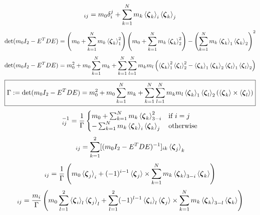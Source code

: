 \documentclass[10pt]{report}
\begin{document}
\begin{equation}[m_0I_2-E^TDE]_{ij}=m_0\delta_i^j+\sum_{k=1}^Nm_k\braket{\boldsymbol{\zeta}_k}_i\braket{\boldsymbol{\zeta}_k}_j\end{equation}
\begin{equation}\det(m_0I_2-E^TDE)=\left(m_0+\sum_{k=1}^Nm_k\braket{\boldsymbol{\zeta}_k}_1^2\right)\left(m_0+\sum_{k=1}^Nm_k\braket{\boldsymbol{\zeta}_k}_2^2\right)-\left(\sum_{k=1}^Nm_k\braket{\boldsymbol{\zeta}_k}_1\braket{\boldsymbol{\zeta}_k}_2\right)^2\end{equation}
\begin{equation}\det(m_0I_2-E^TDE)=m_0^2+m_0\sum_{k=1}^Nm_k+\sum_{k=1}^N\sum_{l=1}^Nm_km_l\left(\braket{\boldsymbol{\zeta}_k}_1^2\braket{\boldsymbol{\zeta}_l}_2^2-\braket{\boldsymbol{\zeta}_k}_1\braket{\boldsymbol{\zeta}_k}_2\braket{\boldsymbol{\zeta}_l}_1\braket{\boldsymbol{\zeta}_l}_2\right)\end{equation}
\begin{equation}\boxed{\Gamma:=\det(m_0I_2-E^TDE)=m_0^2+m_0\sum_{k=1}^Nm_k+\sum_{k=1}^N\sum_{l=1}^Nm_km_l\braket{\boldsymbol{\zeta}_k}_1\braket{\boldsymbol{\zeta}_l}_2(\braket{\boldsymbol{\zeta}_k}\times\braket{\boldsymbol{\zeta}_l})}\end{equation}
\begin{equation}[m_0I_2-E^TDE]^{-1}_{ij}=\frac{1}{\Gamma}\begin{cases}m_0+\sum_{k=1}^Nm_k\braket{\boldsymbol{\zeta}_k}_{3-i}^2&\mbox{if }i=j\\-\sum_{k=1}^Nm_k\braket{\boldsymbol{\zeta}_k}_i\braket{\boldsymbol{\zeta}_k}_j&\mbox{otherwise}\end{cases}\end{equation}
\begin{equation}[(m_0I_2-E^TDE)^{-1}E^T]_{ij}=\sum_{k=1}^2[(m_0I_2-E^TDE)^{-1}]_{ik}\braket{\boldsymbol{\zeta}_j}_k\end{equation}
\begin{equation}[(m_0I_2-E^TDE)^{-1}E^T]_{ij}=\frac{1}{\Gamma}\left(m_0\braket{\boldsymbol{\zeta}_j}_i+(-1)^{i-1}\braket{\boldsymbol{\zeta}_j}\times\sum_{k=1}^Nm_k\braket{\boldsymbol{\zeta}_k}_{3-i}\braket{\boldsymbol{\zeta}_k}\right)\end{equation}
\begin{equation}[DE(m_0I_2-E^TDE)^{-1}E^T]_{ij}=\frac{m_i}{\Gamma}\left(m_0\sum_{l=1}^2\braket{\boldsymbol{\zeta}_i}_l\braket{\boldsymbol{\zeta}_j}_l+\sum_{l=1}^2(-1)^{l-1}\braket{\boldsymbol{\zeta}_i}_l\braket{\boldsymbol{\zeta}_j}\times\sum_{k=1}^Nm_k\braket{\boldsymbol{\zeta}_k}_{3-l}\braket{\boldsymbol{\zeta}_k}\right)\end{equation}
\end{document}
